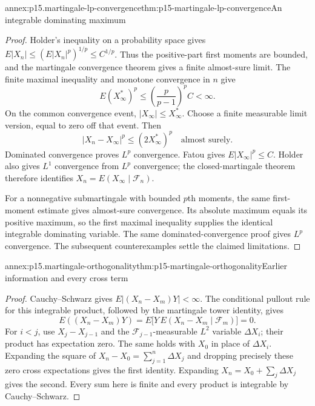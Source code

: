 \begin{annexitem}{annex:p15.martingale-lp-convergence}{thm:p15-martingale-lp-convergence}{An integrable dominating maximum}
\begin{proof}
Holder's inequality on a probability space gives
\(E|X_n|\leq(E|X_n|^p)^{1/p}\leq C^{1/p}\).
Thus the positive-part first moments are bounded, and the
martingale convergence theorem gives a finite almost-sure limit.
The finite maximal inequality and monotone convergence in \(n\)
give
\[
                        E(X_\infty^*)^p
                              \leq\left(\frac p{p-1}\right)^pC<\infty.
\]
On the common convergence event, \(|X_\infty|\leq X_\infty^*\).
Choose a finite measurable limit version, equal to zero off that
event. Then
\[
                    |X_n-X_\infty|^p\leq(2X_\infty^*)^p
                                    \quad\text{almost surely}.
\]
Dominated convergence proves \(L^p\) convergence.
Fatou gives \(E|X_\infty|^p\leq C\).
Holder also gives \(L^1\) convergence from \(L^p\) convergence;
the closed-martingale theorem therefore identifies
\(X_n=E(X_\infty\mid\mathcal F_n)\).

For a nonnegative submartingale with bounded \(p\)th moments,
the same first-moment estimate gives almost-sure convergence.
Its absolute maximum equals its positive maximum, so the first
maximal inequality supplies the identical integrable dominating
variable. The same dominated-convergence proof gives \(L^p\)
convergence. The subsequent counterexamples settle the claimed
limitations.
\end{proof}
\end{annexitem}

\begin{annexitem}{annex:p15.martingale-orthogonality}{thm:p15-martingale-orthogonality}{Earlier information and every cross term}
\begin{proof}
Cauchy--Schwarz gives \(E|(X_n-X_m)Y|<\infty\).
The conditional pullout rule for this integrable product, followed
by the martingale tower identity, gives
\[
 E((X_n-X_m)Y)
      =E\bigl[Y\,E(X_n-X_m\mid\mathcal F_m)\bigr]=0.
\]
For \(i<j\), use \(X_j-X_{j-1}\) and the
\(\mathcal F_{j-1}\)-measurable \(L^2\) variable \(\Delta X_i\);
their product has expectation zero.
The same holds with \(X_0\) in place of \(\Delta X_i\).
Expanding the square of
\(X_n-X_0=\sum_{j=1}^n\Delta X_j\) and dropping precisely these
zero cross expectations gives the first identity.
Expanding \(X_n=X_0+\sum_j\Delta X_j\) gives the second.
Every sum here is finite and every product is integrable by
Cauchy--Schwarz.
\end{proof}
\end{annexitem}

